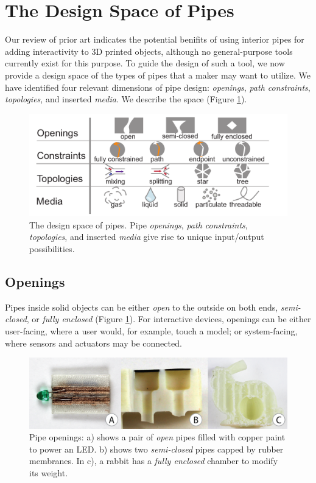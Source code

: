 
\section{The Design Space of Pipes}
Our review of prior art indicates the potential benifits of using interior pipes for adding interactivity to 3D printed objects, although no general-purpose tools currently exist for this purpose. To guide the design of such a tool, we now provide a design space of the types of pipes that a maker may want to utilize. We have identified four relevant dimensions of pipe design: \emph{openings}, \emph{path constraints}, \emph{topologies}, and inserted \emph{media}.  We describe the space (Figure \ref{fig:pipespace}).

\begin{figure}[t]
\centering
    \includegraphics[width=1.0\columnwidth]{figures/tubespace.pdf}
\caption{The design space of pipes.  Pipe \emph{openings}, \emph{path constraints}, \emph{topologies}, and inserted \emph{media} give rise to unique input/output possibilities.}
\label{fig:pipespace}
\end{figure}

\subsection{Openings}
Pipes inside solid objects can be either \emph{open} to the outside on both ends, \emph{semi-closed}, or \emph{fully enclosed} (Figure \ref{fig:pipespace}). For interactive devices, openings can be either user-facing, where a user would, for example, touch a model; or system-facing, where sensors and actuators may be connected.

\begin{figure}[t]
\centering
    \includegraphics[width=1.0\columnwidth]{figures/types.png}
\caption{Pipe openings: a) shows a pair of \emph{open} pipes filled with copper paint to power an LED.  b) shows two \emph{semi-closed} pipes capped by rubber membranes.  In c), a rabbit has a \emph{fully enclosed} chamber to modify its weight.}
\label{fig:openings}
\end{figure}


